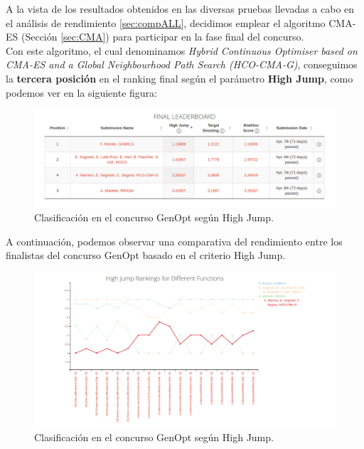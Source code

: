 A la vista de los resultados obtenidos en las diversas pruebas llevadas a cabo en el análisis de rendimiento \ref{sec:compALL}, decidimos emplear el algoritmo CMA-ES (Sección \ref{sec:CMA}) para participar en la fase final del concurso. \\
Con este algoritmo, el cual denominamos \textit{Hybrid Continuous Optimiser based on CMA-ES and a Global Neighbourhood Path Search (HCO-CMA-G)}, conseguimos la \textbf{tercera posición} en el ranking final según el parámetro \textbf{High Jump}, como podemos ver en la siguiente figura: 

\begin{figure}[!ht]
  \centering
	\includegraphics[scale=0.5]{images/final}
  \caption{Clasificación en el concurso GenOpt según High Jump.}
\end{figure}

\newpage

A continuación, podemos observar una comparativa del rendimiento entre los finalistas del concurso GenOpt basado en el criterio High Jump.

\begin{figure}[!ht]
  \centering
  \includegraphics[scale=0.4]{images/highjump}
  \caption{Clasificación en el concurso GenOpt según High Jump.}
\end{figure}

